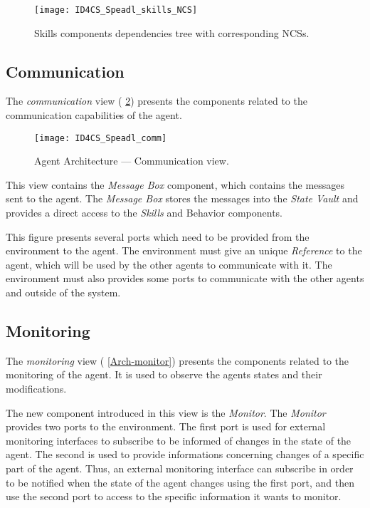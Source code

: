 \begin{figure}
\centering
\texttt{[image: ID4CS\_Speadl\_skills\_NCS]}
\caption{Skills components dependencies tree with corresponding NCSs.}\label{skills:NCS}
\end{figure}

\subsection{Communication}

The \emph{communication} view (\figurename{} \ref{Arch-comm}) presents the components related to the communication capabilities of the agent. 

\begin{figure}
\centering
\texttt{[image: ID4CS\_Speadl\_comm]}
\caption{Agent Architecture --- Communication view.}
\label{Arch-comm}
\end{figure}

This view contains the \emph{Message Box} component, which contains the messages sent to the agent. The \emph{Message Box} stores the messages into the \emph{State Vault} and provides a direct access to the \emph{Skills} and {Behavior} components.

This figure presents several ports which need to be provided from the environment to the agent. The environment must give an unique \emph{Reference} to the agent, which will be used by the other agents to communicate with it. The environment must also provides some ports to communicate with the other agents and outside of the system.

\subsection{Monitoring}

The \emph{monitoring} view (\figurename{} \ref{Arch-monitor}) presents the components related to the monitoring of the agent. It is used to observe the agents states and their modifications.

The new component introduced in this view is the \emph{Monitor}. The \emph{Monitor} provides two ports to the environment. The first port is used for external monitoring interfaces to subscribe to be informed of changes in the state of the agent. The second is used to provide informations concerning changes of a specific part of the agent. Thus, an external monitoring interface can subscribe in order to be notified when the state of the agent changes using the first port, and then use the second port to access to the specific information it wants to monitor.

